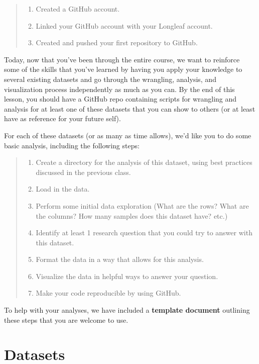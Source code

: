 \documentclass[
  letterpaper,
  DIV=11,
  numbers=noendperiod]{scrreprt}
\begin{document}
\begin{quote}
\begin{enumerate}
\def\labelenumi{\arabic{enumi}.}
\item
  Created a GitHub account.
\item
  Linked your GitHub account with your Longleaf account.
\item
  Created and pushed your first repository to GitHub.
\end{enumerate}
\end{quote}

Today, now that you've been through the entire course, we want to
reinforce some of the skills that you've learned by having you apply
your knowledge to several existing datasets and go through the
wrangling, analysis, and visualization process independently as much as
you can. By the end of this lesson, you should have a GitHub repo
containing scripts for wrangling and analysis for at least one of these
datasets that you can show to others (or at least have as reference for
your future self).

For each of these datasets (or as many as time allows), we'd like you to
do some basic analysis, including the following steps:

\begin{quote}
\begin{enumerate}
\def\labelenumi{\arabic{enumi}.}
\item
  Create a directory for the analysis of this dataset, using best
  practices discussed in the previous class.
\item
  Load in the data.
\item
  Perform some initial data exploration (What are the rows? What are the
  columns? How many samples does this dataset have? etc.)
\item
  Identify at least 1 research question that you could try to answer
  with this dataset.
\item
  Format the data in a way that allows for this analysis.
\item
  Visualize the data in helpful ways to answer your question.
\item
  Make your code reproducible by using GitHub.
\end{enumerate}
\end{quote}

To help with your analyses, we have included a \textbf{template
document} outlining these steps that you are welcome to use.

\section{Datasets}\label{datasets}
\end{document}
